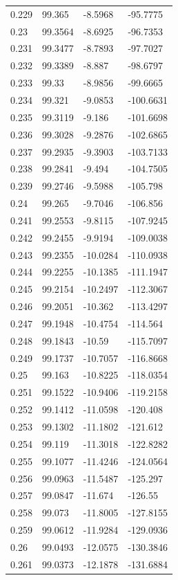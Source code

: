 \begin{tabular}{llll}
0.229 & 99.365 & -8.5968 & -95.7775 \\
0.23 & 99.3564 & -8.6925 & -96.7353 \\
0.231 & 99.3477 & -8.7893 & -97.7027 \\
0.232 & 99.3389 & -8.887 & -98.6797 \\
0.233 & 99.33 & -8.9856 & -99.6665 \\
0.234 & 99.321 & -9.0853 & -100.6631 \\
0.235 & 99.3119 & -9.186 & -101.6698 \\
0.236 & 99.3028 & -9.2876 & -102.6865 \\
0.237 & 99.2935 & -9.3903 & -103.7133 \\
0.238 & 99.2841 & -9.494 & -104.7505 \\
0.239 & 99.2746 & -9.5988 & -105.798 \\
0.24 & 99.265 & -9.7046 & -106.856 \\
0.241 & 99.2553 & -9.8115 & -107.9245 \\
0.242 & 99.2455 & -9.9194 & -109.0038 \\
0.243 & 99.2355 & -10.0284 & -110.0938 \\
0.244 & 99.2255 & -10.1385 & -111.1947 \\
0.245 & 99.2154 & -10.2497 & -112.3067 \\
0.246 & 99.2051 & -10.362 & -113.4297 \\
0.247 & 99.1948 & -10.4754 & -114.564 \\
0.248 & 99.1843 & -10.59 & -115.7097 \\
0.249 & 99.1737 & -10.7057 & -116.8668 \\
0.25 & 99.163 & -10.8225 & -118.0354 \\
0.251 & 99.1522 & -10.9406 & -119.2158 \\
0.252 & 99.1412 & -11.0598 & -120.408 \\
0.253 & 99.1302 & -11.1802 & -121.612 \\
0.254 & 99.119 & -11.3018 & -122.8282 \\
0.255 & 99.1077 & -11.4246 & -124.0564 \\
0.256 & 99.0963 & -11.5487 & -125.297 \\
0.257 & 99.0847 & -11.674 & -126.55 \\
0.258 & 99.073 & -11.8005 & -127.8155 \\
0.259 & 99.0612 & -11.9284 & -129.0936 \\
0.26 & 99.0493 & -12.0575 & -130.3846 \\
0.261 & 99.0373 & -12.1878 & -131.6884 \\

\end{tabular}
